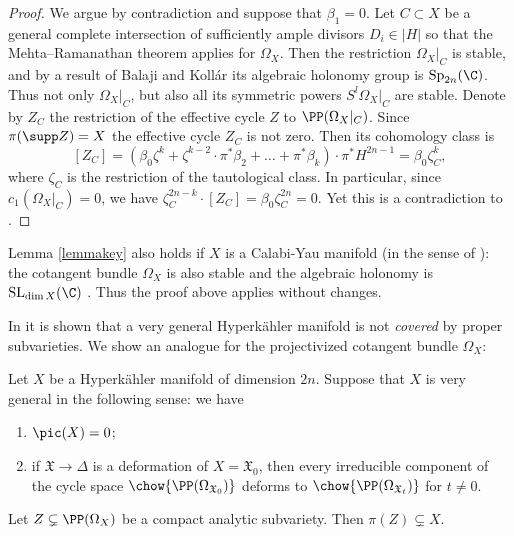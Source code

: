 \begin{proof}
We argue by contradiction and suppose that $\beta_1=0$. Let $C \subset X$ be a general complete intersection
of sufficiently ample divisors $D_i \in | H |$ so that the Mehta--Ramanathan theorem \cite[Th.\,4.3]{MR84} applies for $\Omega_X$. Then the restriction $\Omega_X|_C$ is stable, and by a result of Balaji and Kollár \cite[Prop.\,10]{BK08}
its algebraic holonomy group is $\mbox{Sp}_{2n}(\C)$. Thus not only $\Omega_X|_C$, but also all its symmetric
powers $S^l \Omega_X|_C$ are stable. Denote by $Z_C$ the restriction of the effective cycle $Z$
to $\PP(\Omega_X|_C)$.
Since $\pi(\supp Z) = X$ the effective cycle $Z_C$ is not zero.
Then its cohomology class is
\[
[Z_C]= (\beta_0 \zeta^k + \zeta^{k-2}\cdot \pi^* \beta_2 + \ldots + \pi^* \beta_k) \cdot \pi^* H^{2n-1}
= \beta_0 \zeta_C^k,
\]
where $\zeta_C$ is the restriction of the tautological class. In particular, since $c_1(\Omega_X|_C)=0$, we
have $\zeta_C^{2n-k} \cdot [Z_C] = \beta_0 \zeta_C^{2n} = 0$. Yet this is a contradiction to \cite[Prop.\,1.3]{HP19}.
\end{proof}

\begin{remark}
Lemma \ref{lemmakey} also holds if $X$ is a Calabi-Yau manifold (in the sense of \cite{Bea83}): the cotangent bundle
$\Omega_X$ is also stable and the algebraic holonomy is $\mathrm{SL}_{\dim X}(\C)$ \cite[Prop.\,10]{BK08}.
Thus the proof above applies without changes.
\end{remark}

In \cite[Cor.\,2.6]{COP10} it is shown that a very general Hyperkähler manifold is not {\em covered} by proper subvarieties. We show an analogue for the projectivized cotangent bundle $\Omega_X$:

\begin{lemma}\label{lemmanosubvariety}
Let $X$ be a Hyperkähler manifold of dimension $2n$. Suppose that $X$ is very general in the following sense:
we have
\begin{enumerate}
\item $\pic (X)=0$;
\item if $\mathfrak X \to \Delta$ is a deformation of $X=\mathfrak X_0$, then every irreducible component of the
cycle space $\chow{\PP(\Omega_{\mathfrak X_0})}$ deforms to $\chow{\PP(\Omega_{\mathfrak X_t})}$
for $t \neq 0$.
\end{enumerate}
Let $Z \subsetneq \PP(\Omega_X)$ be a compact analytic subvariety.
Then $\pi(Z) \subsetneq X$.
\end{lemma}

